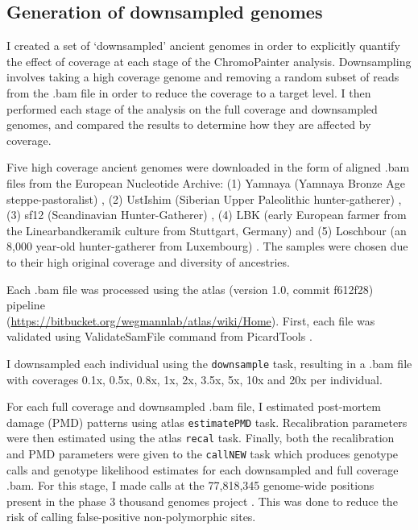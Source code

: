 \subsection{Generation of downsampled genomes}

I created a set of `downsampled' ancient genomes in order to explicitly quantify the effect of coverage at each stage of the ChromoPainter analysis. Downsampling involves taking a high coverage genome and removing a random subset of reads from the .bam file in order to reduce the coverage to a target level. I then performed each stage of the analysis on the full coverage and downsampled genomes, and compared the results to determine how they are affected by coverage.

Five high coverage ancient genomes were downloaded in the form of aligned .bam files from the European Nucleotide Archive: (1) Yamnaya (Yamnaya Bronze Age steppe-pastoralist) \cite{deBarrosDamgaardeaar7711}, (2) UstIshim (Siberian Upper Paleolithic hunter-gatherer) \cite{Fu2014}, (3) sf12 (Scandinavian Hunter-Gatherer) \cite{Gunther2018a}, (4) LBK (early European farmer from the Linearbandkeramik culture from Stuttgart, Germany) \cite{Lazaridis2014} and (5) Loschbour (an 8,000 year-old hunter-gatherer from Luxembourg) \cite{Lazaridis2014}. The samples were chosen due to their high original coverage and diversity of ancestries. 

Each .bam file was processed using the atlas (version 1.0, commit f612f28) pipeline \cite{Link2017} \\(\url{https://bitbucket.org/wegmannlab/atlas/wiki/Home}). First, each file was validated using ValidateSamFile command from PicardTools \cite{Picard2018toolkit}. 

I downsampled each individual using the \texttt{downsample} task, resulting in a .bam file with coverages 0.1x, 0.5x, 0.8x, 1x, 2x, 3.5x, 5x, 10x and 20x per individual. 

For each full coverage and downsampled .bam file, I estimated post-mortem damage (PMD) patterns using atlas \texttt{estimatePMD} task. Recalibration parameters were then estimated using the atlas \texttt{recal} task. Finally, both the recalibration and PMD parameters were given to the \texttt{callNEW} task which produces genotype calls and genotype likelihood estimates for each downsampled and full coverage .bam. For this stage, I made calls at the 77,818,345 genome-wide positions present in the phase 3 thousand genomes project \cite{1000GenomesProjectConsortium2015}. This was done to reduce the risk of calling false-positive non-polymorphic sites.

